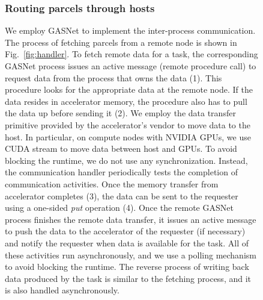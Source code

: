 \begin{figure}[htb]
\subsubsection{Routing parcels through hosts}

We employ GASNet to implement the inter-process communication.
The process of fetching parcels from a remote node is shown in Fig.~\ref{fig:handler}.
To fetch remote data for a task, the corresponding GASNet process issues an active message (remote procedure call) to request data from the process that owns the data (1).
This procedure looks for the appropriate data at the remote node.
If the data resides in accelerator memory, the procedure also has to pull the data up before sending it (2).
We employ the data transfer primitive provided by the accelerator's vendor to move data to the host.
In particular, on compute nodes with NVIDIA GPUs, we use CUDA stream to move data between host and GPUs.
To avoid blocking the runtime, we do not use any synchronization.
Instead, the communication handler periodically tests the completion of communication activities.
Once the memory transfer from accelerator completes (3), the data can be sent to the requester using a one-sided {\em put} operation (4).
Once the remote GASNet process finishes the remote data transfer, it issues an active message to push the data to the accelerator of the requester (if necessary) and notify the requester when data is available for the task.
All of these activities run asynchronously, and we use a polling mechanism to avoid blocking the runtime.
The reverse process of writing back data produced by the task is similar to the fetching process, and it is also handled asynchronously.




\end{figure}
